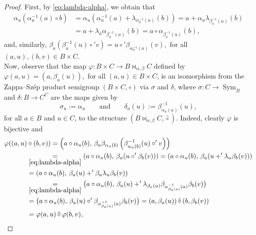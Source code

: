 \documentclass[11pt]{amsart}
\newcommand{\Sym}{\operatorname{Sym}}
\theoremstyle{definition}
\begin{document}
\begin{proof}
First,  by \eqref{eq:lambda-alpha}, we obtain that 
    \begin{align*}
        \alpha_u(\alpha^{-1}_u(a)\circ b) 
        &= \alpha_u\left(\alpha^{-1}_u(a) + \lambda_{\alpha^{-1}_a(u)}(b)\right) 
        = a + \alpha_u\lambda_{\beta^{-1}_a(u)}(b)\\ 
        &= a + \lambda_a\alpha_{\beta^{-1}_a(u)}(b)
        = a\circ\alpha_{\beta^{-1}_a(u)}(b),
    \end{align*}
     and, similarly,
    $\beta^{}_a\left(\beta^{-1}_a(u)\circ' v\right) 
     = u\circ'\beta^{}_{\alpha^{-1}_u(a)}(v),$
     for all $(a,u),(b,v) \in B \times C$. \\
Now, observe that the map $\varphi:B\times C\to B\bowtie_{\alpha,\beta}C$ defined by $\varphi(a,u)= (a,\beta_a(u)),$ for all $(a,u)\in B\times C$, is an isomorphism from the Zappa--Szép product semigroup $(B\times C, \circ)$ via $\sigma$ and $\delta$, where $\sigma:C\to \Sym_B$ and $\delta:B\to C^C$ are the maps given by
     $$
     \sigma_u:= \alpha_u
     \qquad\text{and}\qquad\delta_a(u):= \beta^{-1}_{\alpha_u(a)}(u),
     $$ 
     for all  $a\in B$ and $u\in C$, to the structure $(B\bowtie_{\alpha,\beta}C, \hat{\circ})$. Indeed, clearly $ \varphi$ is bijective and
     \begin{align*}
         \varphi((a,u)&\circ(b,v))
         = \left (a\circ\alpha_u(b),\, \beta_a\beta_{\alpha_u(b)}\left(\beta^{-1}_{\alpha_u(b)}(u)\circ' v\right) \right)\\
         &\underset{\eqref{eq:lambda-alpha}}{=}(a\circ\alpha_u(b),\, \beta_a(u\circ'\beta_b(v)))
         = (a\circ\alpha_u(b),\, \beta_a(u +' \lambda_u\beta_b(v)))\\
         &=(a\circ\alpha_u(b),\, \beta_a(u) +' \beta_a\lambda_u\beta_b(v))\\
         &\underset{\eqref{eq:lambda-alpha}}{=} \big(a\circ\alpha_u(b),\, \beta_a(u) +' \lambda_{\beta_a(u)}\beta_{\alpha^{-1}_{\beta_a(u)}(a)}\beta_b(v)\big)
         \\
         &= \big(a\circ\alpha_u(b),\, \beta_a(u)\circ'  \beta_{\alpha^{-1}_{\beta_a(u)}(a)}\beta_b(v)\big)= (a,\beta_a(u))\,\hat{\circ}\,(b,\beta_b(v))\\
         &= \varphi(a,u)\, \hat{\circ}\, \varphi(b,v),
     \end{align*}

\end{proof}
\end{document}
